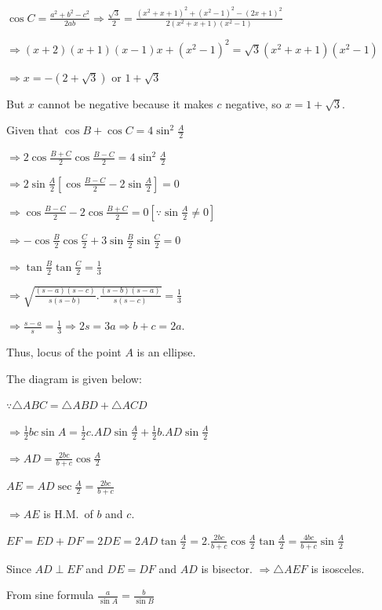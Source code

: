   $\cos C = \frac{a^2 + b^2 - c^2}{2ab} \Rightarrow \frac{\sqrt{3}}{2} = \frac{\left(x^2 + x +
  1\right)^2 + \left(x^2 - 1\right)^2 - (2x + 1)^2}{2\left(x^2 + x + 1\right)\left(x^2 - 1\right)}$

  $\Rightarrow (x + 2)(x + 1)(x - 1)x + \left(x^2 - 1\right)^2 = \sqrt{3}\left(x^2 + x + 1\right)\left(x^2
  - 1\right)$

  $\Rightarrow x = -(2 + \sqrt{3})$ or $1 + \sqrt{3}$

  But $x$ cannot be negative because it makes $c$ negative, so $x = 1 + \sqrt{3}$.
\item Given that $\cos B + \cos C = 4\sin^2\frac{A}{2}$

  $\Rightarrow 2\cos\frac{B + C}{2}\cos\frac{B - C}{2} = 4\sin^2\frac{A}{2}$

  $\Rightarrow 2\sin\frac{A}{2}\left[\cos\frac{B - C}{2} - 2\sin\frac{A}{2}\right] = 0$

  $\Rightarrow \cos\frac{B - C}{2} - 2\cos\frac{B + C}{2} = 0\left[\because \sin\frac{A}{2}\ne 0\right]$

  $\Rightarrow -\cos\frac{B}{2}\cos\frac{C}{2} + 3\sin\frac{B}{2}\sin\frac{C}{2} = 0$

  $\Rightarrow \tan\frac{B}{2}\tan\frac{C}{2} = \frac{1}{3}$

  $\Rightarrow \sqrt{\frac{(s - a)(s - c)}{s(s - b)}.\frac{(s - b)(s - a)}{s(s - c)}} = \frac{1}{3}$

  $\Rightarrow \frac{s - a}{s} = \frac{1}{3}\Rightarrow 2s = 3a \Rightarrow b + c = 2a$.

  Thus, locus of the point $A$ is an ellipse.
\item The diagram is given below:

  \startplacefigure
    \externalfigure[17_17.pdf]
  \stopplacefigure

  $\because \triangle ABC = \triangle ABD + \triangle ACD$

  $\Rightarrow \frac{1}{2}bc\sin A = \frac{1}{2}c.AD\sin\frac{A}{2} + \frac{1}{2}b.AD\sin\frac{A}{2}$

  $\Rightarrow AD = \frac{2bc}{b + c}\cos\frac{A}{2}$

  $AE = AD\sec\frac{A}{2} = \frac{2bc}{b + c}$

  $\Rightarrow AE$ is H.M.\ of $b$ and $c$.

  $EF = ED + DF = 2DE = 2AD\tan\frac{A}{2} = 2.\frac{2bc}{b + c}\cos\frac{A}{2}\tan\frac{A}{2}
  = \frac{4bc}{b + c}\sin\frac{A}{2}$

  Since $AD\perp EF$ and $DE = DF$ and $AD$ is bisector. $\Rightarrow \triangle AEF$ is isosceles.
\item From sine formula $\frac{a}{\sin A} = \frac{b}{\sin B}$

